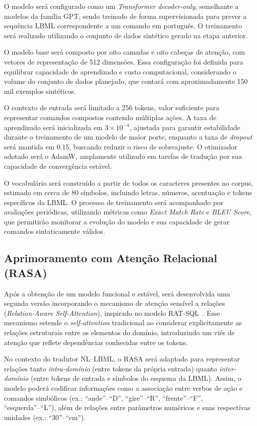 \documentclass[12pt]{article}
\begin{document}
O modelo será configurado como um \textit{Transformer decoder-only}, semelhante a modelos da família GPT, sendo treinado de forma supervisionada para prever a sequência LBML correspondente a um comando em português. O treinamento será realizado utilizando o conjunto de dados sintético gerado na etapa anterior.

O modelo base será composto por oito camadas e oito cabeças de atenção, com vetores de representação de 512 dimensões. Essa configuração foi definida para equilibrar capacidade de aprendizado e custo computacional, considerando o volume do conjunto de dados planejado, que contará com aproximadamente 150 mil exemplos sintéticos. 

O contexto de entrada será limitado a 256 tokens, valor suficiente para representar comandos compostos contendo múltiplas ações. A taxa de aprendizado será inicializada em $3\times10^{-4}$, ajustada para garantir estabilidade durante o treinamento de um modelo de maior porte, enquanto a taxa de \textit{dropout} será mantida em 0.15, buscando reduzir o risco de sobreajuste. O otimizador adotado será o AdamW, amplamente utilizado em tarefas de tradução por sua capacidade de convergência estável.

O vocabulário será construído a partir de todos os caracteres presentes no corpus, estimado em cerca de 80 símbolos, incluindo letras, números, acentuação e tokens específicos da LBML. O processo de treinamento será acompanhado por avaliações periódicas, utilizando métricas como \textit{Exact Match Rate} e \textit{BLEU Score}, que permitirão monitorar a evolução do modelo e sua capacidade de gerar comandos sintaticamente válidos.

\subsection{Aprimoramento com Atenção Relacional (RASA)}

Após a obtenção de um modelo funcional e estável, será desenvolvida uma segunda versão incorporando o mecanismo de atenção sensível a relações (\textit{Relation-Aware Self-Attention}), inspirado no modelo RAT-SQL~\citep{Wang2019}. Esse mecanismo estende o \textit{self-attention} tradicional ao considerar explicitamente as relações estruturais entre os elementos do domínio, introduzindo um viés de atenção que reflete dependências conhecidas entre os tokens.

No contexto do tradutor NL–LBML, o RASA será adaptado para representar relações tanto \textit{intra-domínio} (entre tokens da própria entrada) quanto \textit{inter-domínio} (entre tokens de entrada e símbolos do esquema da LBML). Assim, o modelo poderá codificar informações como a associação entre verbos de ação e comandos simbólicos (ex.: ``ande''–``D'', ``gire''–``R'', ``frente''–``F'', ``esquerda''–``L''), além de relações entre parâmetros numéricos e suas respectivas unidades (ex.: ``30''–``cm'').
\end{document}
